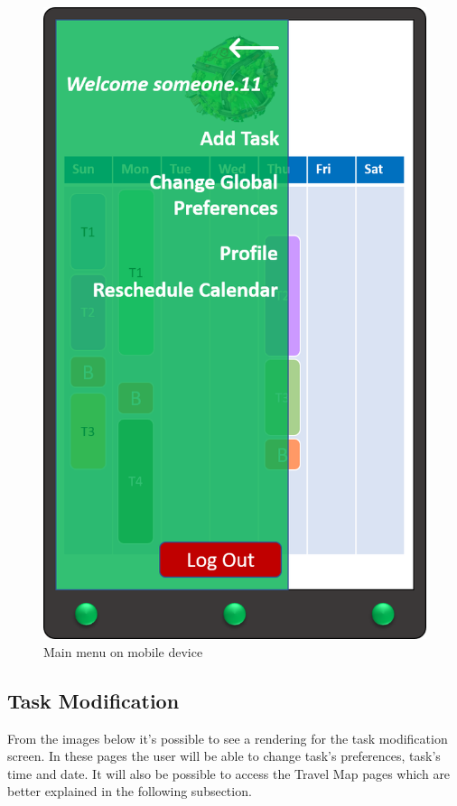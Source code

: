 \begin{figure}[H]
    \centering
    \includegraphics[scale=0.3]{Pictures/Mockups/AppMenu.png}
    \caption{Main menu on mobile device}
\end{figure}

\subsection*{Task Modification}
From the images below it's possible to see a rendering for the task modification screen. In these pages the user will be able to change task's preferences, task's time and date. It will also be possible to access the Travel Map pages which are better explained in the following subsection.

